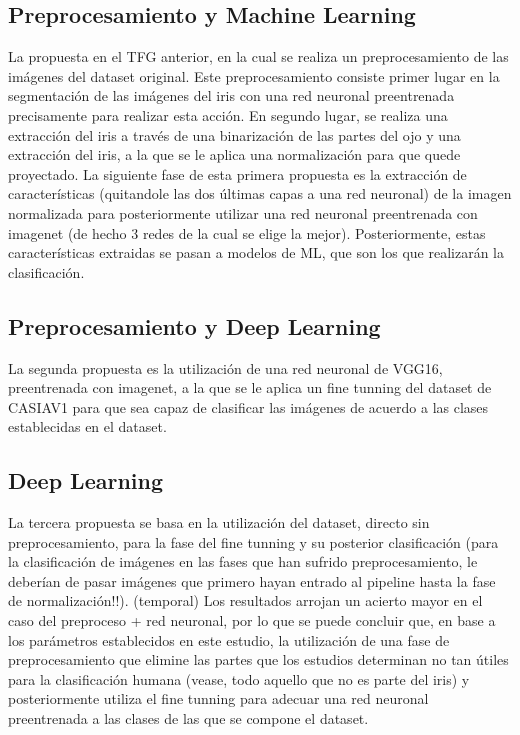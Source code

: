 \subsection{Preprocesamiento y Machine Learning}

La propuesta en el TFG anterior, en la cual se realiza un preprocesamiento de las imágenes del dataset original. Este preprocesamiento consiste primer lugar 
en la segmentación de las imágenes del iris con una red neuronal preentrenada precisamente para realizar esta acción. En segundo lugar, se realiza una extracción
del iris a través de una binarización de las partes del ojo y una extracción del iris, a la que se le aplica una normalización para que quede proyectado.
La siguiente fase de esta primera propuesta es la extracción de características (quitandole las dos últimas capas a una red neuronal) de la imagen normalizada
 para posteriormente utilizar una red neuronal preentrenada con imagenet (de hecho 3 redes de la cual se elige la mejor). Posteriormente, estas características
 extraidas se pasan a modelos de ML, que son los que realizarán la clasificación. 

\subsection{Preprocesamiento y Deep Learning}

La segunda propuesta es la utilización de una red neuronal de VGG16, preentrenada con imagenet, a la que se le aplica un fine tunning del dataset de CASIAV1 para
que sea capaz de clasificar las imágenes de acuerdo a las clases establecidas en el dataset.

\subsection{Deep Learning}

La tercera propuesta se basa en la utilización del dataset, directo sin preprocesamiento, para la fase del fine tunning y su posterior clasificación (para la clasificación de imágenes en las fases
que han sufrido preprocesamiento, le deberían de pasar imágenes que primero hayan entrado al pipeline hasta la fase de normalización!!).
(temporal) Los resultados arrojan un acierto mayor en el caso del preproceso + red neuronal, por lo que se puede concluir que, en base a los parámetros establecidos en este estudio, la utilización de 
una fase de preprocesamiento que elimine las partes que los estudios determinan no tan útiles para la clasificación humana (vease, todo aquello que no es parte del iris)
 y posteriormente utiliza el fine tunning para adecuar una red neuronal preentrenada a las clases de las que se compone el dataset.

